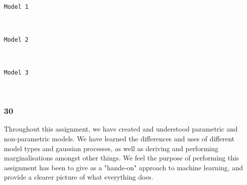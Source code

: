 \documentclass[11pt]{article}
\begin{document}
    \begin{center}
    \end{center}
    { \hspace*{\fill} \\}
    
    \begin{Verbatim}[commandchars=\\\{\}]
Model 1

    \end{Verbatim}

    \begin{center}
    \end{center}
    { \hspace*{\fill} \\}
    
    \begin{Verbatim}[commandchars=\\\{\}]
Model 2

    \end{Verbatim}

    \begin{center}
    \end{center}
    { \hspace*{\fill} \\}
    
    \begin{Verbatim}[commandchars=\\\{\}]
Model 3

    \end{Verbatim}

    \begin{center}
    \end{center}
    { \hspace*{\fill} \\}
    
    \subsubsection{30}\label{section}

Throughout this assignment, we have created and understood parametric
and non-parametric models. We have learned the differences and uses of
different model types and gaussian processes, as well as deriving and
performing marginalisations amongst other things. We feel the purpose of
performing this assignment has been to give as a "hands-on" approach to
machine learning, and provide a clearer picture of what everything does.


    
    
    
    
\end{document}
